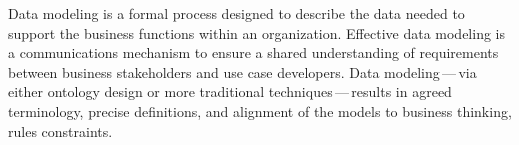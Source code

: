 %
%
Data modeling
is a formal process designed to describe the data needed to support the business functions within an organization.
Effective data modeling is a communications mechanism to ensure a shared understanding of requirements between
business stakeholders and use case developers.
Data modeling\,---\,via either ontology design or more traditional techniques\,---\,results in agreed terminology,
precise definitions, and alignment of the models to business thinking, rules constraints.

